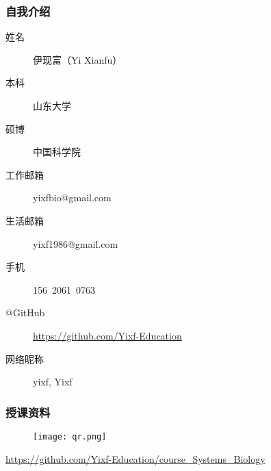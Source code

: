 \begin{frame}
  \frametitle{自我介绍}
    \begin{description}
      \item[姓\qquad 名]伊现富（Yi Xianfu）
      \item[本\qquad 科]山东大学
      \item[硕\qquad 博]中国科学院
      \item[工作邮箱]\alert{yixfbio@gmail.com}
      \item[生活邮箱]yixf1986@gmail.com
      \item[手\qquad 机]\alert{156\ 2061\ 0763}
      \item[@GitHub]\alert{\href{https://github.com/Yixf-Education}{https://github.com/Yixf-Education}}
      \item[网络昵称]yixf, Yixf
    \end{description}
\end{frame}

\begin{frame}
  \frametitle{授课资料}
  \begin{figure}
    \centering
    \texttt{[image: qr.png]}
  \end{figure}
  \begin{center}
  \href{https://github.com/Yixf-Education/course_Systems_Biology}{https://github.com/Yixf-Education/course\_Systems\_Biology}
  \end{center}
\end{frame}


